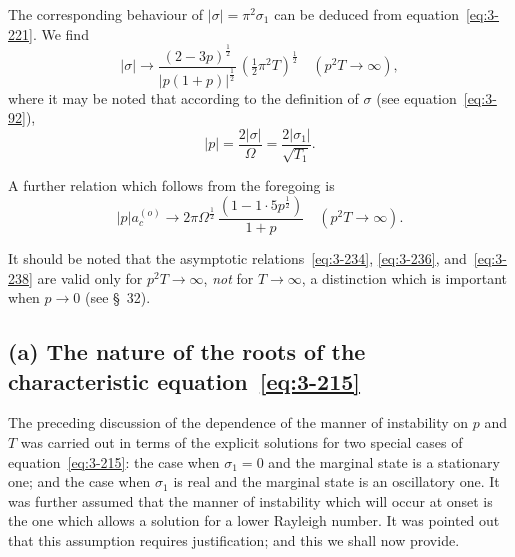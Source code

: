 The corresponding behaviour of $|\sigma| = \pi^2\sigma_1$ can be deduced from equation~\eqref{eq:3-221}. We find
\begin{equation}\label{eq:3-236}
|\sigma| \to \frac{(2-3p)^{\frac{1}{2}}}{|p(1+p)|^{\frac{1}{2}}}\,(\tfrac{1}{2}\pi^2 T)^{\frac{1}{2}} \quad (p^2 T \to \infty),
\end{equation}
where it may be noted that according to the definition of $\sigma$ (see equation~\eqref{eq:3-92}),
\begin{equation}\label{eq:3-237}
|p| = \frac{2|\sigma|}{\Omega} = \frac{2|\sigma_1|}{\sqrt{T_1}}.
\end{equation}

A further relation which follows from the foregoing is
\begin{equation}\label{eq:3-238}
|p|a_c^{(o)} \to 2\pi\Omega^{\frac{1}{2}}\,\frac{(1-1{\cdot}5p^{\frac{1}{2}})}{1+p} \quad (p^2 T \to \infty).
\end{equation}

It should be noted that the asymptotic relations~\eqref{eq:3-234}, \eqref{eq:3-236}, and~\eqref{eq:3-238} are valid only for $p^2 T \to \infty$, \emph{not} for $T \to \infty$, a distinction which is important when $p \to 0$ (see \S~32).


\subsection*{(a) The nature of the roots of the characteristic equation~\eqref{eq:3-215}}

The preceding discussion of the dependence of the manner of instability on $p$ and $T$ was carried out in terms of the explicit solutions for two special cases of equation~\eqref{eq:3-215}: the case when $\sigma_1 = 0$ and the marginal state is a stationary one; and the case when $\sigma_1$ is real and the marginal state is an oscillatory one. It was further assumed that the manner of instability which will occur at onset is the one which allows a solution for a lower Rayleigh number. It was pointed out that this assumption requires justification; and this we shall now provide.

